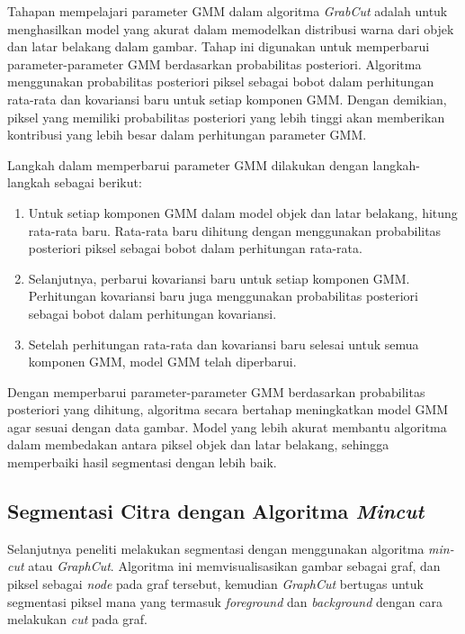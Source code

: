 Tahapan mempelajari parameter GMM dalam algoritma \emph{GrabCut} adalah untuk 
menghasilkan model yang akurat dalam memodelkan distribusi warna dari objek 
dan latar belakang dalam gambar. Tahap ini digunakan untuk memperbarui parameter-parameter 
GMM berdasarkan probabilitas posteriori. Algoritma menggunakan probabilitas posteriori 
piksel sebagai bobot dalam perhitungan rata-rata dan kovariansi baru untuk setiap 
komponen GMM. Dengan demikian, piksel yang memiliki probabilitas posteriori yang 
lebih tinggi akan memberikan kontribusi yang lebih besar dalam perhitungan parameter GMM.

Langkah dalam memperbarui parameter GMM dilakukan dengan langkah-langkah sebagai berikut:
\begin{enumerate}
    \item Untuk setiap komponen GMM dalam model objek dan latar belakang, hitung 
    rata-rata baru. Rata-rata baru dihitung dengan menggunakan probabilitas posteriori 
    piksel sebagai bobot dalam perhitungan rata-rata.
    \item Selanjutnya, perbarui kovariansi baru untuk setiap komponen GMM. Perhitungan 
    kovariansi baru juga menggunakan probabilitas posteriori sebagai bobot dalam 
    perhitungan kovariansi.
    \item Setelah perhitungan rata-rata dan kovariansi baru selesai untuk semua 
    komponen GMM, model GMM telah diperbarui.
\end{enumerate}

Dengan memperbarui parameter-parameter GMM berdasarkan probabilitas posteriori yang 
dihitung, algoritma secara bertahap meningkatkan model GMM agar sesuai dengan data gambar. 
Model yang lebih akurat membantu algoritma dalam membedakan antara piksel objek dan 
latar belakang, sehingga memperbaiki hasil segmentasi dengan lebih baik.


\subsection{Segmentasi Citra dengan Algoritma \emph{Mincut}}

Selanjutnya peneliti melakukan segmentasi dengan menggunakan algoritma \emph{min-cut}
atau \emph{GraphCut}. Algoritma ini memvisualisasikan gambar sebagai graf, dan piksel 
sebagai \emph{node} pada graf tersebut, kemudian \emph{GraphCut} bertugas untuk 
segmentasi piksel mana yang termasuk \emph{foreground} dan \emph{background} dengan cara
melakukan \emph{cut} pada graf. 

